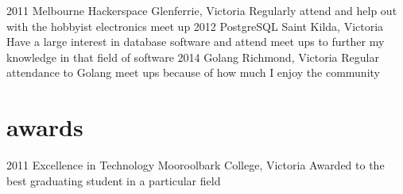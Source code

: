 \documentclass[]{friggeri-cv} %
\begin{document}
\begin{entrylist}
\entry
{2011}
{Melbourne Hackerspace}
{Glenferrie, Victoria}
{Regularly attend and help out with the hobbyist electronics meet up}
\entry
{2012}
{PostgreSQL}
{Saint Kilda, Victoria}
{Have a large interest in database software and attend meet ups to further my knowledge in that field of software}
\entry
{2014}
{Golang}
{Richmond, Victoria}
{Regular attendance to Golang meet ups because of how much I enjoy the community}
\end{entrylist}


\section{awards}

\begin{entrylist}
\entry
{2011}
{Excellence in Technology}
{Mooroolbark College, Victoria}
{Awarded to the best graduating student in a particular field}
\end{entrylist}


\end{document}
